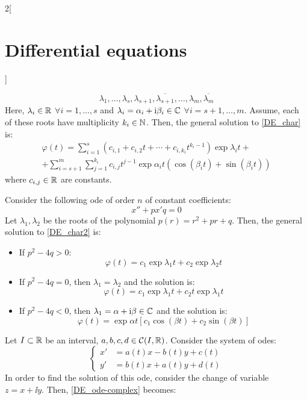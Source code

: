 \documentclass[../../../main.tex]{subfiles}
\begin{document}
\begin{multicols}{2}[\section{Differential equations}]
\begin{method}
    $$\lambda_1,\ldots,\lambda_s,\lambda_{s+1},\overline{\lambda_{s+1}},\ldots,\lambda_{m},\overline{\lambda_m}$$
    Here, $\lambda_i\in\mathbb{R}$ $\forall i=1,\ldots,s$ and $\lambda_{i}=\alpha_i+\mathrm{i}\beta_i\in\mathbb{C}$ $\forall i=s+1,\ldots,m$. Assume, each of these roots have multiplicity $k_i\in\mathbb{N}$. Then, the general solution to \cref{DE_char} is:
    \begin{multline*}
      \varphi(t)=\sum_{i=1}^s\left(c_{i,1}+c_{i,2}t+\cdots+c_{i,k_i}t^{k_i-1}\right)\exp{\lambda_i t}+\\
      +\sum_{i=s+1}^m\sum_{j=1}^{k_i}c_{i,j}t^{j-1}\exp{\alpha_i t}\left(\cos(\beta_i t)+\sin(\beta_i t)\right)
    \end{multline*}
    where $c_{i,j}\in\mathbb{R}$ are constants.
  \end{method}
  \begin{corollary}
    Consider the following ode of order $n$ of constant coefficients:
    \begin{equation}\label{DE_char2}
      x'' + px' q = 0
    \end{equation}
    Let $\lambda_1,\lambda_2$ be the roots of the polynomial $p(r)=r^2+pr+q$.
    Then, the general solution to \cref{DE_char2} is:
    \begin{itemize}
      \item If $p^2-4q>0$: $$\varphi(t)=c_1\exp{\lambda_1t}+c_2\exp{\lambda_2t}$$
      \item If $p^2-4q=0$, then $\lambda_1=\lambda_2$ and the solution is: $$\varphi(t)=c_1\exp{\lambda_1t}+c_2t\exp{\lambda_1t}$$
      \item If $p^2-4q<0$, then $\lambda_1=\alpha+\mathrm{i}\beta\in\mathbb{C}$ and the solution is: $$\varphi(t)=\exp{\alpha t}\left[c_1\cos(\beta t)+c_2\sin(\beta t)\right]$$
    \end{itemize}
  \end{corollary}
  \begin{method}
    Let $I\subset \mathbb{R}$ be an interval, $a,b,c,d\in\mathcal{C}(I,\mathbb{R})$. Consider the system of odes:
    \begin{equation}\label{DE_ode-complex}
      \left\{
      \begin{aligned}
        x' & =a(t)x-b(t)y+c(t) \\
        y' & =b(t)x+a(t)y+d(t)
      \end{aligned}
      \right.
    \end{equation}
    In order to find the solution of this ode, consider the change of variable $z=x+\ii y$. Then, \cref{DE_ode-complex} becomes:

\end{method}
\end{multicols}
\end{document}
